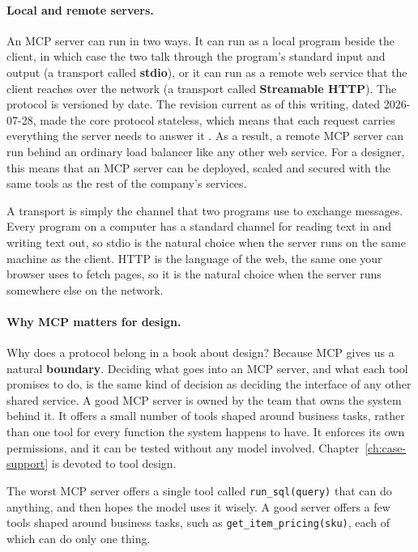 \paragraph{Local and remote servers.} An MCP server can run in two ways. It can run as a local program beside the client, in which case the two talk through the program's standard input and output (a transport called \textbf{stdio}), or it can run as a remote web service that the client reaches over the network (a transport called \textbf{Streamable HTTP}). The protocol is versioned by date. The revision current as of this writing, dated 2026-07-28, made the core protocol stateless, which means that each request carries everything the server needs to answer it \citep{mcp2026spec}. As a result, a remote MCP server can run behind an ordinary load balancer like any other web service. For a designer, this means that an MCP server can be deployed, scaled and secured with the same tools as the rest of the company's services.

A transport is simply the channel that two programs use to exchange messages. Every program on a computer has a standard channel for reading text in and writing text out, so stdio is the natural choice when the server runs on the same machine as the client. HTTP is the language of the web, the same one your browser uses to fetch pages, so it is the natural choice when the server runs somewhere else on the network.


\paragraph{Why MCP matters for design.} Why does a protocol belong in a book about design? Because MCP gives us a natural \textbf{boundary}. Deciding what goes into an MCP server, and what each tool promises to do, is the same kind of decision as deciding the interface of any other shared service. A good MCP server is owned by the team that owns the system behind it. It offers a small number of tools shaped around business tasks, rather than one tool for every function the system happens to have. It enforces its own permissions, and it can be tested without any model involved. Chapter~\ref{ch:case-support} is devoted to tool design.

\begin{watchout}
The worst MCP server offers a single tool called \texttt{run\_sql(query)} that can do anything, and then hopes the model uses it wisely. A good server offers a few tools shaped around business tasks, such as \texttt{get\_item\_pricing(sku)}, each of which can do only one thing.
\end{watchout}

